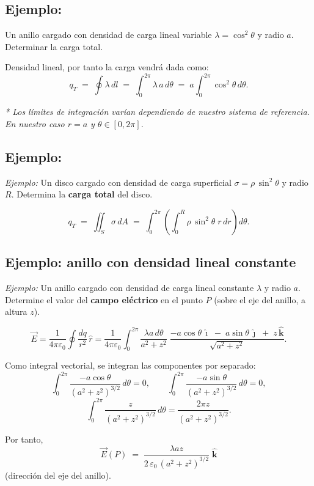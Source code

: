 \documentclass[a4paper,12pt]{article}
\begin{document}
\subsection*{Ejemplo:}
Un anillo cargado con densidad de carga lineal variable $\lambda=\cos^{2}\theta$ y radio $a$.
Determinar la carga total.

Densidad lineal, por tanto la carga vendrá dada como:
\[
q_T \;=\; \oint \lambda\, dl
 \;=\; \int_{0}^{2\pi} \lambda\, a\, d\theta
 \;=\; a \int_{0}^{2\pi} \cos^{2}\theta\, d\theta .
\]

\textit{* Los límites de integración varían dependiendo de nuestro sistema de referencia.  
En nuestro caso $r=a$ y $\theta\in[0,2\pi]$.}

\bigskip

\subsection*{Ejemplo:}

\noindent
\textit{Ejemplo:} Un disco cargado con densidad de carga superficial $\sigma=\rho\,\sin^{2}\theta$ y radio $R$.  
Determina la \textbf{carga total} del disco.

\[
q_T \;=\; \iint_{S} \sigma\, dA
   \;=\; \int_{0}^{2\pi}\!\left(\int_{0}^{R} \rho\,\sin^{2}\theta \; r\,dr\right)\! d\theta .
\]

\bigskip

\subsection*{Ejemplo: anillo con densidad lineal constante}

\noindent
\textit{Ejemplo:} Un anillo cargado con densidad de carga lineal constante $\lambda$ y radio $a$.  
Determine el valor del \textbf{campo eléctrico} en el punto $P$ (sobre el eje del anillo, a altura $z$).

\[
\vec E
= \frac{1}{4\pi\varepsilon_0}\oint \frac{dq}{r^2}\,\hat r
= \frac{1}{4\pi\varepsilon_0}\int_{0}^{2\pi}
   \frac{\lambda a\, d\theta}{a^{2}+z^{2}}\;
   \frac{-a\cos\theta\,\hat{\imath}\;-\;a\sin\theta\,\hat{\jmath}\;+\;z\,\hat{\mathbf k}}
        {\sqrt{a^{2}+z^{2}}}.
\]

Como integral vectorial, se integran las componentes por separado:
\[
\int_{0}^{2\pi} \frac{-a\cos\theta}{(a^{2}+z^{2})^{3/2}}\, d\theta = 0, \qquad
\int_{0}^{2\pi} \frac{-a\sin\theta}{(a^{2}+z^{2})^{3/2}}\, d\theta = 0,
\]
\[
\int_{0}^{2\pi} \frac{z}{(a^{2}+z^{2})^{3/2}}\, d\theta
= \frac{2\pi z}{(a^{2}+z^{2})^{3/2}}.
\]

Por tanto,
\[
\boxed{\;
\vec E(P) \;=\; \frac{\lambda a z}{2\,\varepsilon_0\,(a^{2}+z^{2})^{3/2}}\;\hat{\mathbf k}
\;}
\]
(dirección del eje del anillo).
\end{document}
